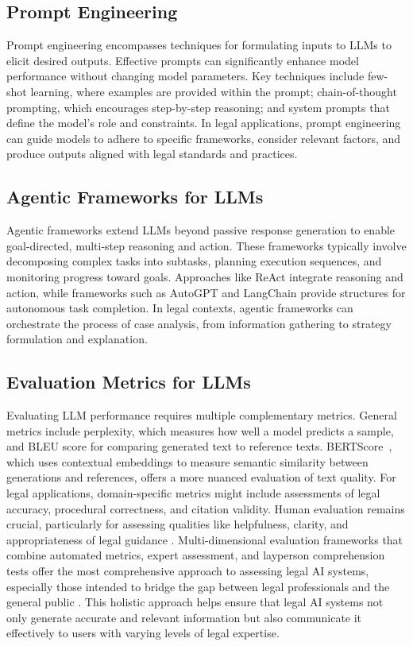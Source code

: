 \subsection{Prompt Engineering}
Prompt engineering encompasses techniques for formulating inputs to LLMs to 
elicit desired outputs. Effective prompts can significantly enhance model 
performance without changing model parameters. Key techniques include few-shot 
learning, where examples are provided within the prompt; chain-of-thought prompting, 
which encourages step-by-step reasoning; and system prompts that define the model's role 
and constraints. In legal applications, prompt engineering can guide models to adhere 
to specific frameworks, consider relevant factors, and produce outputs aligned with 
legal standards and practices.
\subsection{Agentic Frameworks for LLMs}
Agentic frameworks extend LLMs beyond passive response generation to enable goal-directed, 
multi-step reasoning and action. These frameworks typically involve decomposing complex 
tasks into subtasks, planning execution sequences, and monitoring progress toward goals. 
Approaches like ReAct integrate reasoning and action, while frameworks such
as AutoGPT and LangChain provide structures for autonomous task completion. 
In legal contexts, agentic frameworks can orchestrate the process of case analysis, 
from information gathering to strategy formulation and explanation.
\subsection{Evaluation Metrics for LLMs}
Evaluating LLM performance requires multiple complementary metrics. General metrics 
include perplexity, which measures how well a model predicts a sample, 
and BLEU score for comparing generated text to reference texts. 
BERTScore~\cite{zhang2020bertscoreevaluatingtextgeneration}, which uses contextual 
embeddings to measure semantic similarity between generations and references, 
offers a more nuanced evaluation of text quality. For legal applications, 
domain-specific metrics might include assessments of legal accuracy, 
procedural correctness, and citation validity. Human evaluation remains crucial, 
particularly for assessing qualities like helpfulness, clarity, and appropriateness 
of legal guidance \cite{guha2023legalbench, li2024experimentinglegalaisolutions}. 
Multi-dimensional evaluation frameworks that combine automated metrics, expert assessment, 
and layperson comprehension tests offer the most comprehensive approach to assessing legal AI systems, 
especially those intended to bridge the gap between legal professionals and the general public \cite{guo2023evaluating}. 
This holistic approach helps ensure that legal AI systems not only generate accurate and relevant 
information but also communicate it effectively to users with varying levels of legal expertise.
